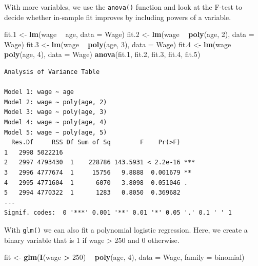 \documentclass[]{article}
\newenvironment{Shaded}{\begin{snugshade}}{\end{snugshade}}
\newcommand{\DataTypeTok}[1]{\textcolor[rgb]{0.13,0.29,0.53}{#1}}
\newcommand{\DecValTok}[1]{\textcolor[rgb]{0.00,0.00,0.81}{#1}}
\newcommand{\FloatTok}[1]{\textcolor[rgb]{0.00,0.00,0.81}{#1}}
\newcommand{\KeywordTok}[1]{\textcolor[rgb]{0.13,0.29,0.53}{\textbf{#1}}}
\newcommand{\NormalTok}[1]{#1}
\newcommand{\OperatorTok}[1]{\textcolor[rgb]{0.81,0.36,0.00}{\textbf{#1}}}
\newcommand{\StringTok}[1]{\textcolor[rgb]{0.31,0.60,0.02}{#1}}
\begin{document}
With more variables, we use the \texttt{anova()} function and look at the F-test to decide whether in-sample fit improves by including powers of a variable.

\begin{Shaded}
\begin{Highlighting}[]
\NormalTok{fit}\FloatTok{.1}\NormalTok{ <-}\StringTok{ }\KeywordTok{lm}\NormalTok{(wage }\OperatorTok{~}\StringTok{ }\NormalTok{age, }\DataTypeTok{data =}\NormalTok{ Wage)}
\NormalTok{fit}\FloatTok{.2}\NormalTok{ <-}\StringTok{ }\KeywordTok{lm}\NormalTok{(wage }\OperatorTok{~}\StringTok{ }\KeywordTok{poly}\NormalTok{(age, }\DecValTok{2}\NormalTok{), }\DataTypeTok{data =}\NormalTok{ Wage)}
\NormalTok{fit}\FloatTok{.3}\NormalTok{ <-}\StringTok{ }\KeywordTok{lm}\NormalTok{(wage }\OperatorTok{~}\StringTok{ }\KeywordTok{poly}\NormalTok{(age, }\DecValTok{3}\NormalTok{), }\DataTypeTok{data =}\NormalTok{ Wage)}
\NormalTok{fit}\FloatTok{.4}\NormalTok{ <-}\StringTok{ }\KeywordTok{lm}\NormalTok{(wage }\OperatorTok{~}\StringTok{ }\KeywordTok{poly}\NormalTok{(age, }\DecValTok{4}\NormalTok{), }\DataTypeTok{data =}\NormalTok{ Wage)}
\KeywordTok{anova}\NormalTok{(fit}\FloatTok{.1}\NormalTok{, fit}\FloatTok{.2}\NormalTok{, fit}\FloatTok{.3}\NormalTok{, fit}\FloatTok{.4}\NormalTok{, fit}\FloatTok{.5}\NormalTok{)}
\end{Highlighting}
\end{Shaded}

\begin{verbatim}
Analysis of Variance Table

Model 1: wage ~ age
Model 2: wage ~ poly(age, 2)
Model 3: wage ~ poly(age, 3)
Model 4: wage ~ poly(age, 4)
Model 5: wage ~ poly(age, 5)
  Res.Df     RSS Df Sum of Sq        F    Pr(>F)    
1   2998 5022216                                    
2   2997 4793430  1    228786 143.5931 < 2.2e-16 ***
3   2996 4777674  1     15756   9.8888  0.001679 ** 
4   2995 4771604  1      6070   3.8098  0.051046 .  
5   2994 4770322  1      1283   0.8050  0.369682    
---
Signif. codes:  0 '***' 0.001 '**' 0.01 '*' 0.05 '.' 0.1 ' ' 1
\end{verbatim}

With \texttt{glm()} we can also fit a polynomial logistic regression. Here, we create a binary variable that is 1 if wage \textgreater{} 250 and 0 otherwise.

\begin{Shaded}
\begin{Highlighting}[]
\NormalTok{fit <-}\StringTok{ }\KeywordTok{glm}\NormalTok{(}\KeywordTok{I}\NormalTok{(wage }\OperatorTok{>}\StringTok{ }\DecValTok{250}\NormalTok{) }\OperatorTok{~}\StringTok{ }\KeywordTok{poly}\NormalTok{(age, }\DecValTok{4}\NormalTok{), }\DataTypeTok{data =}\NormalTok{ Wage, }\DataTypeTok{family =}\NormalTok{ binomial)}
\end{Highlighting}
\end{Shaded}
\end{document}
